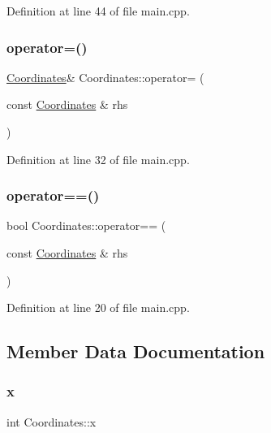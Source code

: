 Definition at line 44 of file main.\+cpp.

\mbox{\label{class_coordinates_a69f77696d70f40693fb6a15c7b7833de}} 
\subsubsection{\texorpdfstring{operator=()}{operator=()}}
{\footnotesize\ttfamily \mbox{\hyperlink{class_coordinates}{Coordinates}}\& Coordinates\+::operator= (\begin{DoxyParamCaption}\item[{const \mbox{\hyperlink{class_coordinates}{Coordinates}} \&}]{rhs }\end{DoxyParamCaption})\hspace{0.3cm}{\ttfamily [inline]}}



Definition at line 32 of file main.\+cpp.

\mbox{\label{class_coordinates_ac534d35d1892e05d2bfe12f8595fec18}} 
\subsubsection{\texorpdfstring{operator==()}{operator==()}}
{\footnotesize\ttfamily bool Coordinates\+::operator== (\begin{DoxyParamCaption}\item[{const \mbox{\hyperlink{class_coordinates}{Coordinates}} \&}]{rhs }\end{DoxyParamCaption})\hspace{0.3cm}{\ttfamily [inline]}}



Definition at line 20 of file main.\+cpp.



\subsection{Member Data Documentation}
\mbox{\label{class_coordinates_a11c878fbd2d0805c91af17d2ba2289a1}} 
\subsubsection{\texorpdfstring{x}{x}}
{\footnotesize\ttfamily int Coordinates\+::x}



